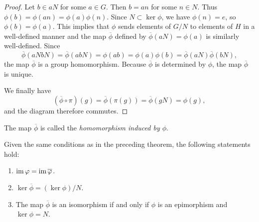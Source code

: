 \begin{proof}
    Let \(b \in aN\) for some \(a \in G\). Then \(b = an\) for some \(n \in N\).
    Thus \(\phi(b) = \phi(an) = \phi(a)\phi(n)\). Since \(N \subset \ker \phi\),
    we have \(\phi(n) = e\), so \(\phi(b) = \phi(a)\). This implies that
    \(\phi\) sends elements of \(G/N\) to elements of \(H\) in a well-defined
    manner and the map \(\overline{\phi}\) defined by \(\overline{\phi}(aN) =
    \phi(a)\) is similarly well-defined. Since
    \[
    \overline{\phi}(aNbN) = \overline{\phi}(abN) = \phi(ab) = \phi(a)\phi(b) = \overline{\phi}(aN)\overline{\phi}(bN),
    \]
    the map \(\overline{\phi}\) is a group homomorphism. Because
    \(\overline{\phi}\) is determined by \(\phi\), the map \(\overline{\phi}\)
    is unique.

    We finally have
    \[
        (\overline{\phi} \circ \pi)(g) = \overline{\phi}(\pi(g)) = \overline{\phi}(gN) = \phi(g),
    \]
    and the diagram therefore commutes.
\end{proof}

\begin{remark}
    The map \(\overline{\phi}\) is called the \emph{homomorphism induced by
    \(\phi\)}.
\end{remark}

\begin{theorem}
    Given the same conditions as in the preceding theorem, the following
    statements hold:
    \begin{enumerate}[label=(\alph*)]
        \item \(\operatorname{im} \varphi = \operatorname{im} \overline{\varphi}\).
        \item \(\ker \overline{\phi} = (\ker \phi)/N\).
        \item The map \(\overline{\phi}\) is an isomorphism if and only if
        \(\phi\) is an epimorphism and \(\ker \phi = N\).
    \end{enumerate}
\end{theorem}

